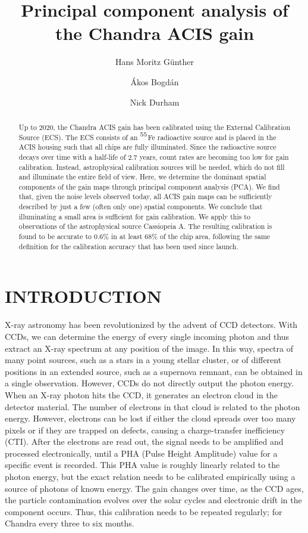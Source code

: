\documentclass[]{spie}  %
\title{Principal component analysis of the Chandra ACIS gain}
\author[a]{Hans Moritz G\"unther}
\author[b]{\'Akos Bogd\'an}
\author[b]{Nick Durham }
\affil[a]{MIT Kavli Institute for Astrophysics and Space Research, Massachusetts Institute of Technology, Cambridge, MA 02139, USA}
\affil[b]{Smithsonian Astrophysical Observatory, Cambridge, MA 02138, USA}
\begin{document}
\maketitle

\begin{abstract}
Up to 2020, the Chandra ACIS gain has been calibrated using the External Calibration Source (ECS). The ECS consists of an $^{\rm{55}}$Fe radioactive source and is placed in the ACIS housing such that all chips are fully illuminated. Since the radioactive source decays over time with a half-life of 2.7 years, count rates are becoming too low for gain calibration. Instead, astrophysical calibration sources will be needed, which do not fill and illuminate the entire field of view. Here, we determine the dominant spatial components of the gain maps through principal component analysis (PCA). We find that, given the noise levels observed today, all ACIS gain maps can be sufficiently described by just a few (often only one) spatial components. We conclude that illuminating a small area is sufficient for gain calibration. We apply this to observations of the astrophysical source Cassiopeia A. The resulting calibration is found to be accurate to 0.6\% in at least 68\% of the chip area, following the same definition for the calibration accuracy that has been used since launch.
\end{abstract}



\section{INTRODUCTION}
\label{sec:intro}
X-ray astronomy has been revolutionized by the advent of CCD detectors. With CCDs, we can determine the energy of every single incoming photon and thus extract an X-ray spectrum at any position of the image. In this way, spectra of many point sources, such as a stars in a young stellar cluster, or of different positions in an extended source, such as a supernova remnant, can be obtained in a single observation. However, CCDs do not directly output the photon energy. When an X-ray photon hits the CCD, it generates an electron cloud in the detector material. The number of electrons in that cloud is related to the photon energy. However, electrons can be lost if either the cloud spreads over too many pixels or if they are trapped on defects, causing a charge-transfer inefficiency (CTI)\cite{2002NIMPA.486..751T,GrantCTI}. After the electrons are read out, the signal needs to be amplified and processed electronically, until a PHA (Pulse Height Amplitude) value for a specific event is recorded. This PHA value is roughly linearly related to the photon energy, but the exact relation needs to be calibrated empirically using a source of photons of known energy. The gain changes over time, as the CCD ages, the particle contamination evolves over the solar cycles and electronic drift in the component occurs. Thus, this calibration needs to be repeated regularly; for Chandra every three to six months.
\end{document}
